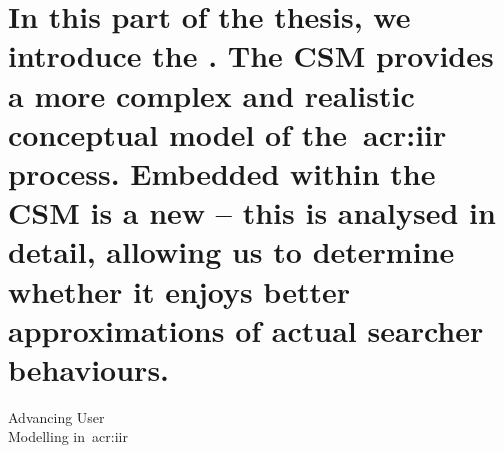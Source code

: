 
\part[Advancing User Modelling]{In this part of the thesis, we introduce the . The CSM provides a more complex and realistic conceptual model of the~\gls{acr:iir} process. Embedded within the CSM is a new  – this is analysed in detail, allowing us to determine whether it enjoys better approximations of actual searcher behaviours.}{Advancing User\\Modelling in~\gls{acr:iir}}\label{part:stopping}